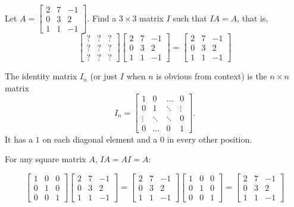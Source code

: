 \begin{applicationActivities}

\begin{activity}{5}
Let $A=\begin{bmatrix} 2 & 7 & -1 \\ 0 & 3 & 2 \\ 1 & 1 & -1 \end{bmatrix}$.  Find a $3 \times 3$ matrix $I$ such that $IA=A$, that is,
\[
  \begin{bmatrix} ? & ? & ? \\ ? & ? & ? \\ ? & ? & ? \end{bmatrix}
  \begin{bmatrix} 2 & 7 & -1 \\ 0 & 3 & 2 \\ 1 & 1 & -1 \end{bmatrix}
=
  \begin{bmatrix} 2 & 7 & -1 \\ 0 & 3 & 2 \\ 1 & 1 & -1 \end{bmatrix}
\]
\end{activity}

\begin{definition}
The identity matrix $I_n$ (or just $I$ when $n$ is obvious from context) is  the $n \times n$ matrix $$I_n = \begin{bmatrix} 1 & 0  & \hdots & 0 \\ 0 & 1 & \ddots & \vdots  \\ \vdots & \ddots & \ddots & 0 \\ 0 & \hdots & 0 & 1 \end{bmatrix}.$$
It has a $1$ on each diagonal element and a $0$ in every other position.
\end{definition}

\begin{fact}
  For any square matrix \(A\), \(IA=AI=A\):

  \[
    \begin{bmatrix} 1 & 0 & 0 \\ 0 & 1 & 0 \\ 0 & 0 & 1 \end{bmatrix}
    \begin{bmatrix} 2 & 7 & -1 \\ 0 & 3 & 2 \\ 1 & 1 & -1 \end{bmatrix}
  =
    \begin{bmatrix} 2 & 7 & -1 \\ 0 & 3 & 2 \\ 1 & 1 & -1 \end{bmatrix}
      \begin{bmatrix} 1 & 0 & 0 \\ 0 & 1 & 0 \\ 0 & 0 & 1 \end{bmatrix}
  =
    \begin{bmatrix} 2 & 7 & -1 \\ 0 & 3 & 2 \\ 1 & 1 & -1 \end{bmatrix}
  \]
\end{fact}


\end{applicationActivities}
